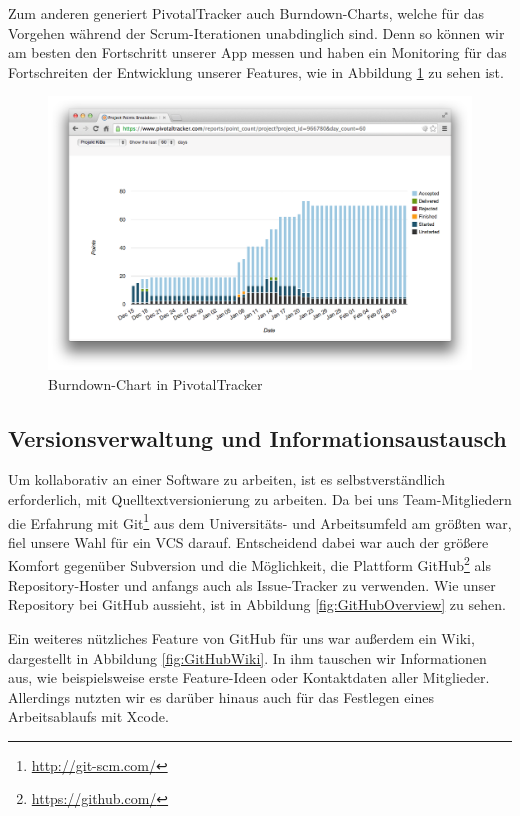 \noindent	Zum anderen generiert PivotalTracker auch Burndown-Charts, welche für das Vorgehen während der Scrum-Iterationen unabdinglich sind. Denn so können wir am besten den Fortschritt unserer App messen und haben ein Monitoring für das Fortschreiten der Entwicklung unserer Features, wie in Abbildung \ref{fig:TrackerBurndown} zu sehen ist.

\begin{figure}[h]
	\centering
	\includegraphics[scale=.25]{Pictures/TrackerBurndown}
	\vspace{-.8cm}
	\caption{Burndown-Chart in PivotalTracker\label{fig:TrackerBurndown}}
\end{figure}

\subsection{Versionsverwaltung und Informationsaustausch}
	Um kollaborativ an einer Software zu arbeiten, ist es selbstverständlich erforderlich, mit Quelltextversionierung zu arbeiten. Da bei uns Team-Mitgliedern die Erfahrung mit Git\footnote{\url{http://git-scm.com/}} aus dem Universitäts- und Arbeitsumfeld am größten war, fiel unsere Wahl für ein \acs{VCS} darauf. Entscheidend dabei war auch der größere Komfort gegenüber Subversion und die Möglichkeit, die Plattform GitHub\footnote{\url{https://github.com/}} als Repository-Hoster und anfangs auch als Issue-Tracker zu verwenden. Wie unser Repository bei GitHub aussieht, ist in Abbildung \ref{fig:GitHubOverview} zu sehen.
	
	Ein weiteres nützliches Feature von GitHub für uns war außerdem ein Wiki, dargestellt in Abbildung \ref{fig:GitHubWiki}. In ihm tauschen wir Informationen aus, wie beispielsweise erste Feature-Ideen oder Kontaktdaten aller Mitglieder. Allerdings nutzten wir es darüber hinaus auch für das Festlegen eines Arbeitsablaufs mit Xcode.
	
